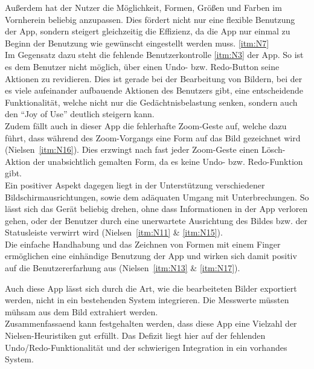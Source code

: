 Außerdem hat der Nutzer die Möglichkeit, Formen, Größen und Farben im Vornherein beliebig anzupassen.
Dies fördert nicht nur eine flexible Benutzung der App, sondern steigert gleichzeitig die Effizienz, da die App nur einmal zu Beginn der Benutzung wie gewünscht eingestellt werden muss. \autoref{itm:N7} \\

Im Gegensatz dazu steht die fehlende Benutzerkontrolle \autoref{itm:N3} der App.
So ist es dem Benutzer nicht möglich, über einen Undo- bzw. Redo-Button seine Aktionen zu revidieren.
Dies ist gerade bei der Bearbeitung von Bildern, bei der es viele aufeinander aufbauende Aktionen des Benutzers gibt, eine entscheidende Funktionalität, welche nicht nur die Gedächtnisbelastung senken, sondern auch den ``Joy of Use'' deutlich steigern kann. \\

Zudem fällt auch in dieser App die fehlerhafte Zoom-Geste auf, welche dazu führt, dass während des Zoom-Vorgangs eine Form auf das Bild gezeichnet wird (Nielsen~\autoref{itm:N16}).
Dies erzwingt nach fast jeder Zoom-Geste einen Lösch-Aktion der unabsichtlich gemalten Form, da es keine Undo- bzw. Redo-Funktion gibt. \\

Ein positiver Aspekt dagegen liegt in der Unterstützung verschiedener Bildschirmausrichtungen, sowie dem adäquaten Umgang mit Unterbrechungen.
So lässt sich das Gerät beliebig drehen, ohne dass Informationen in der App verloren gehen, oder der Benutzer durch eine unerwartete Ausrichtung des Bildes bzw. der Statusleiste verwirrt wird (Nielsen~\autoref{itm:N11} \& \autoref{itm:N15}). \\

Die einfache Handhabung und das Zeichnen von Formen mit einem Finger ermöglichen eine einhändige Benutzung der App und wirken sich damit positiv auf die Benutzererfarhung aus (Nielsen~\autoref{itm:N13} \& \autoref{itm:N17}).

Auch diese App lässt sich durch die Art, wie die bearbeiteten Bilder exportiert werden, nicht in ein bestehenden System integrieren.
Die Messwerte müssten mühsam aus dem Bild extrahiert werden. \\

Zusammenfassaend kann festgehalten werden, dass diese App eine Vielzahl der Nielsen-Heuristiken gut erfüllt.
Das Defizit liegt hier auf der fehlenden Undo/Redo-Funktionalität und der schwierigen Integration in ein vorhandes System.

